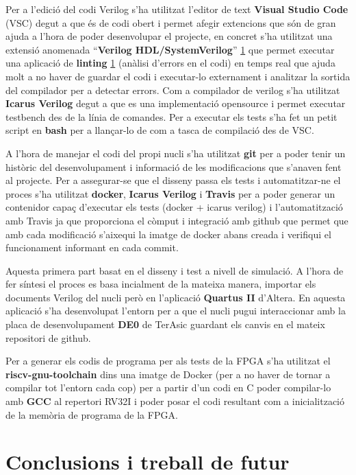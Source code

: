 \documentclass[10pt,a4paper,twocolumn,twoside]{article}
\begin{document}
Per a l'edició del codi Verilog s'ha utilitzat l'editor de text \textbf{Visual Studio Code} (VSC) degut a que és de codi obert i permet afegir extencions que són de gran ajuda a l'hora de poder desenvolupar el projecte, en concret s'ha utilitzat una extensió anomenada ``\textbf{Verilog HDL/SystemVerilog}'' \ref{} que permet executar una aplicació de \textbf{linting} \ref{} (anàlisi d'errors en el codi) en temps real que ajuda molt a no haver de guardar el codi i executar-lo externament i analitzar la sortida del compilador per a detectar errors. Com a compilador de verilog s'ha utilitzat \textbf{Icarus Verilog} degut a que es una implementació opensource i permet executar testbench des de la línia de comandes. Per a executar els tests s'ha fet un petit script en \textbf{bash} per a llançar-lo de com a tasca de compilació des de VSC. 

A l'hora de manejar el codi del propi nucli s'ha utilitzat \textbf{git} per a poder tenir un històric del desenvolupament i informació de les modificacions que s'anaven fent al projecte. Per a assegurar-se que el disseny passa els tests i automatitzar-ne el proces s'ha utilitzat \textbf{docker}, \textbf{Icarus Verilog} i \textbf{Travis} per a poder generar un contenidor capaç d'executar els tests (docker + icarus verilog) i l'automatització amb Travis ja que proporciona el còmput i integració amb github que permet que amb cada modificació s'aixequi la imatge de docker abans creada i verifiqui el funcionament informant en cada commit. 

Aquesta primera part basat en el disseny i test a nivell de simulació. A l'hora de fer síntesi el proces es basa incialment de la mateixa manera, importar els documents Verilog del nucli però en l'aplicació \textbf{Quartus II} d'Altera. En aquesta aplicació s'ha desenvolupat l'entorn per a que el nucli pugui interaccionar amb la placa de desenvolupament \textbf{DE0} de TerAsic guardant els canvis en el mateix repositori de github.

Per a generar els codis de programa per als tests de la FPGA s'ha utilitzat el \textbf{riscv-gnu-toolchain} dins una imatge de Docker (per a no haver de tornar a compilar tot l'entorn cada cop) per a partir d'un codi en C poder compilar-lo amb \textbf{GCC} al repertori RV32I i poder posar el codi resultant com a inicialització de la memòria de programa de la FPGA.

\section{Conclusions i treball de futur}  %
\end{document}

